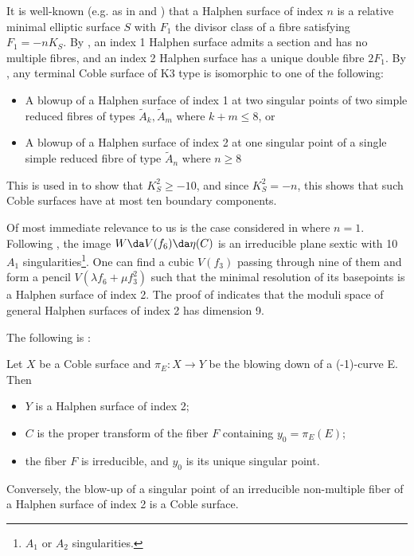 \documentclass[../../main.tex]{subfiles}
\begin{document}
\begin{remark}
It is well-known (e.g. as in \cite{DZ99} and \cite[Ch.5 \S 6]{CD12}) that a Halphen surface of index $n$ is a relative minimal elliptic surface $S$ with $F_1$ the divisor class of a fibre satisfying $F_1 = -n K_S$. By \cite[\S 2.4]{DZ99}, an index 1 Halphen surface admits a section and has no multiple fibres, and an index 2 Halphen surface has a unique double fibre $2F_1$.
By \cite[Prop. 9.1.4]{DK24}, any terminal Coble surface of K3 type is isomorphic to one of the following:

\begin{itemize}
    \item A blowup of a Halphen surface of index 1 at two singular points of two simple reduced fibres of types $\tilde A_k, \tilde A_m$ where $k+m\leq 8$, or
    \item A blowup of a Halphen surface of index 2 at one singular point of a single simple reduced fibre of type $\tilde A_n$ where $n\geq 8$
\end{itemize}
This is used in \cite[Prop. 9.1.5]{DK24} to show that $K_S^2 \geq -10$, and since $K_S^2 = -n$, this shows that such Coble surfaces have at most ten boundary components.

Of most immediate relevance to us is the case considered in \cite{Cob19} where $n=1$. Following \cite[Ex. 9.1.7]{DK24}, the image $W \da V(f_6) \da \eta(C)$ is an irreducible plane sextic with 10 $A_1$ singularities\footnote{$A_1$ or $A_2$ singularities.}. One can find a cubic $V(f_3)$ passing through nine of them and form a pencil $V(\lambda f_6 + \mu f_3^2)$ such that the minimal resolution of its basepoints is a Halphen surface of index 2. The proof of \cite[Prop. 9.1.8]{DK24} indicates that the moduli space of general Halphen surfaces of index 2 has dimension 9.
\end{remark}


The following is \cite[Prop. \, 3.1]{CD12}:

\begin{lemma}\label{lem:coble_halphen_blowdown}
Let $X$ be a Coble surface and $\pi_{E}: X \rightarrow Y$ be the blowing down of a (-1)-curve E. Then

\begin{itemize}
    \item $Y$ is a Halphen surface of index 2;
    \item $C$ is the proper transform of the fiber $F$ containing $y_{0}=\pi_{E}(E)$;
    \item the fiber $F$ is irreducible, and $y_{0}$ is its unique singular point.
\end{itemize}
Conversely, the blow-up of a singular point of an irreducible non-multiple fiber of a Halphen surface of index 2 is a Coble surface.
\end{lemma}
\end{document}
